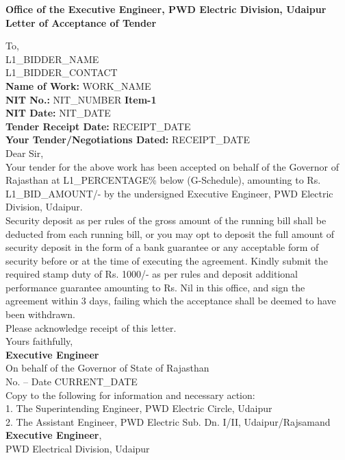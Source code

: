 \documentclass[a4paper]{article}
\begin{document}
\begin{center}
    \textbf{\Large Office of the Executive Engineer, PWD Electric Division, Udaipur} \\
    \vspace{0.5cm}
    \textbf{Letter of Acceptance of Tender}
\end{center}

To, \\
{L1_BIDDER_NAME} \\
{L1_BIDDER_CONTACT} \\

\vspace{0.5cm}
\textbf{Name of Work:} {WORK_NAME} \\
\textbf{NIT No.:} {NIT_NUMBER} \quad \textbf{Item-1} \\
\textbf{NIT Date:} {NIT_DATE} \\
\textbf{Tender Receipt Date:} {RECEIPT_DATE} \\
\textbf{Your Tender/Negotiations Dated:} {RECEIPT_DATE} \\

Dear Sir, \\

Your tender for the above work has been accepted on behalf of the Governor of Rajasthan at {L1_PERCENTAGE}\% below (G-Schedule), amounting to Rs. {L1_BID_AMOUNT}/- by the undersigned Executive Engineer, PWD Electric Division, Udaipur. \\

Security deposit as per rules of the gross amount of the running bill shall be deducted from each running bill, or you may opt to deposit the full amount of security deposit in the form of a bank guarantee or any acceptable form of security before or at the time of executing the agreement. Kindly submit the required stamp duty of Rs. 1000/- as per rules and deposit additional performance guarantee amounting to Rs. Nil in this office, and sign the agreement within 3 days, failing which the acceptance shall be deemed to have been withdrawn. \\

Please acknowledge receipt of this letter. \\

Yours faithfully, \\
\vspace{0.5cm}
\textbf{Executive Engineer} \\
On behalf of the Governor of State of Rajasthan \\

No. -- \hspace{45mm} Date {CURRENT_DATE} \\
Copy to the following for information and necessary action: \\
1. The Superintending Engineer, PWD Electric Circle, Udaipur \\
2. The Assistant Engineer, PWD Electric Sub. Dn. I/II, Udaipur/Rajsamand \\

\textbf{Executive Engineer}, \\
PWD Electrical Division, Udaipur
\end{document}

